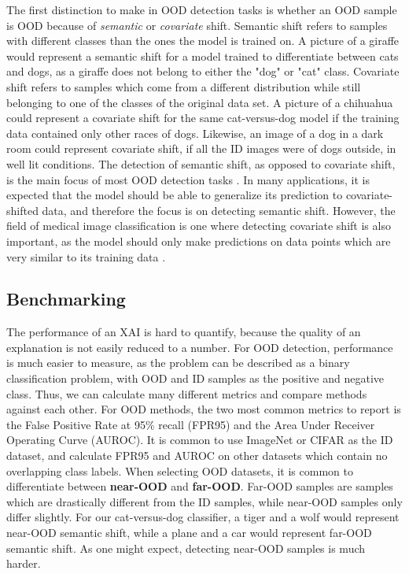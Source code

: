\documentclass[UKenglish]{uiomasterthesis} %
\theoremstyle{definition}
\begin{document}
The first distinction to make in OOD detection tasks is whether an OOD sample is OOD because of {\it semantic} or {\it covariate} shift. Semantic shift refers to samples with different classes than the ones the model is trained on. A picture of a giraffe would represent a semantic shift for a model trained to differentiate between cats and dogs, as a giraffe does not belong to either the "dog" or "cat" class. Covariate shift refers to samples which come from a different distribution while still belonging to one of the classes of the original data set. A picture of a chihuahua could represent a covariate shift for the same cat-versus-dog model if the training data contained only other races of dogs. Likewise, an image of a dog in a dark room could represent covariate shift, if all the ID images were of dogs outside, in well lit conditions. The detection of semantic shift, as opposed to covariate shift, is the main focus of most OOD detection tasks \cite{oodoverview}. In many applications, it is expected that the model should be able to generalize its prediction to covariate-shifted data, and therefore the focus is on detecting semantic shift. However, the field of medical image classification is one where detecting covariate shift is also important, as the model should only make predictions on data points which are very similar to its training data \cite{oodoverview}.


\subsection{Benchmarking}

The performance of an XAI is hard to quantify, because the quality of an explanation is not easily reduced to a number. For OOD detection, performance is much easier to measure, as the problem can be described as a binary classification problem, with OOD and ID samples as the positive and negative class. Thus, we can calculate many different metrics and compare methods against each other. For OOD methods, the two most common metrics to report is the False Positive Rate at 95\% recall (FPR95) and the Area Under Receiver Operating Curve (AUROC). It is common to use ImageNet or CIFAR as the ID dataset, and calculate FPR95 and AUROC on other datasets which contain no overlapping class labels. When selecting OOD datasets, it is common to differentiate between \textbf{near-OOD} and \textbf{far-OOD}. Far-OOD samples are samples which are drastically different from the ID samples, while near-OOD samples only differ slightly. For our cat-versus-dog classifier, a tiger and a wolf would represent near-OOD semantic shift, while a plane and a car would represent far-OOD semantic shift. As one might expect, detecting near-OOD samples is much harder.
\end{document}
